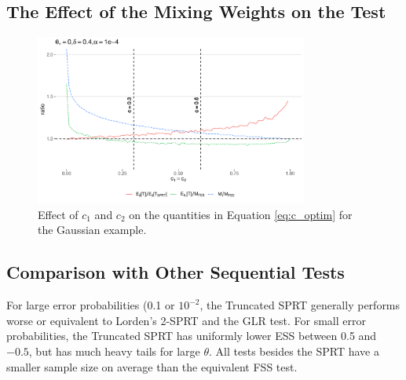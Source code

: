 \documentclass[11pt]{article}
\begin{document}
\subsection{The Effect of the Mixing Weights on the Test}


\begin{figure}
\centering
\includegraphics[width=0.8\textwidth]{images/c1_c2_ratios}
\caption{Effect of $c_1$ and $c_2$ on the quantities in Equation \ref{eq:c_optim} for the Gaussian example.}
\end{figure}

\subsection{Comparison with Other Sequential Tests}\label{sec:comparisons}

For large error probabilities (0.1 or $10^{-2}$, the Truncated SPRT generally performs worse or equivalent to Lorden's 2-SPRT and the GLR test. For small error probabilities, the Truncated SPRT has uniformly lower ESS between 0.5 and $-0.5$, but has much heavy tails for large $\theta$. All tests besides the SPRT have a smaller sample size on average than the equivalent FSS test.
\end{document}
